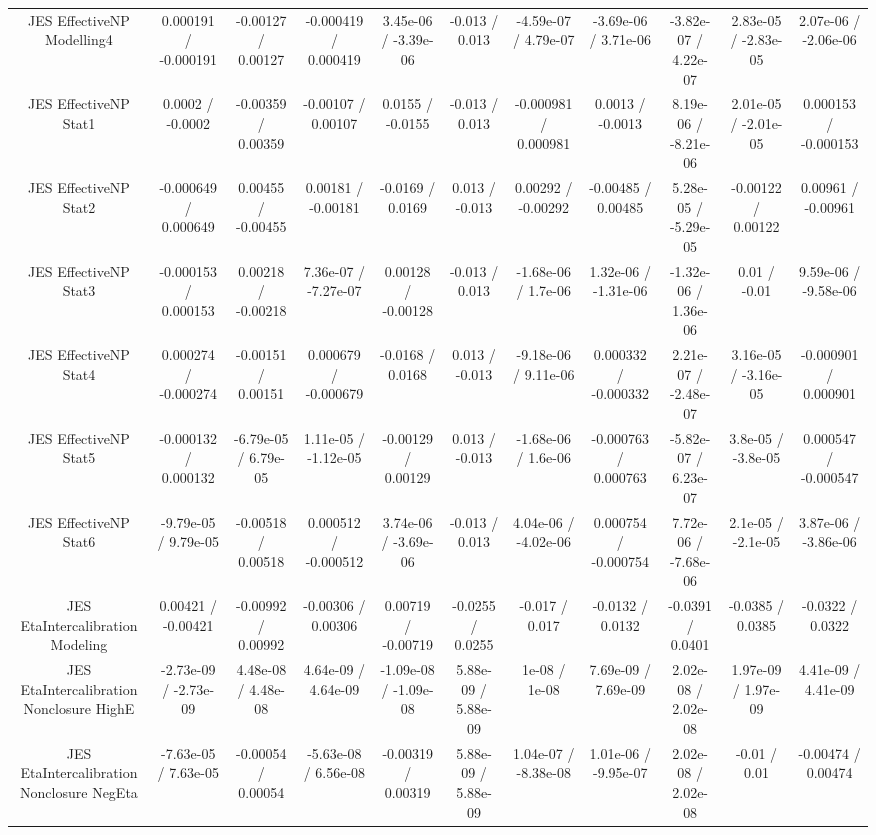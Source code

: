 \begin{table}[htbp]
\begin{center}
\begin{tabular}{|c|c|c|c|c|c|c|c|c|c|c|}
  JES EffectiveNP Modelling4 & 0.000191 / -0.000191 & -0.00127 / 0.00127 & -0.000419 / 0.000419 & 3.45e-06 / -3.39e-06 & -0.013 / 0.013 & -4.59e-07 / 4.79e-07 & -3.69e-06 / 3.71e-06 & -3.82e-07 / 4.22e-07 & 2.83e-05 / -2.83e-05 & 2.07e-06 / -2.06e-06 \\ 
  JES EffectiveNP Stat1 & 0.0002 / -0.0002 & -0.00359 / 0.00359 & -0.00107 / 0.00107 & 0.0155 / -0.0155 & -0.013 / 0.013 & -0.000981 / 0.000981 & 0.0013 / -0.0013 & 8.19e-06 / -8.21e-06 & 2.01e-05 / -2.01e-05 & 0.000153 / -0.000153 \\ 
  JES EffectiveNP Stat2 & -0.000649 / 0.000649 & 0.00455 / -0.00455 & 0.00181 / -0.00181 & -0.0169 / 0.0169 & 0.013 / -0.013 & 0.00292 / -0.00292 & -0.00485 / 0.00485 & 5.28e-05 / -5.29e-05 & -0.00122 / 0.00122 & 0.00961 / -0.00961 \\ 
  JES EffectiveNP Stat3 & -0.000153 / 0.000153 & 0.00218 / -0.00218 & 7.36e-07 / -7.27e-07 & 0.00128 / -0.00128 & -0.013 / 0.013 & -1.68e-06 / 1.7e-06 & 1.32e-06 / -1.31e-06 & -1.32e-06 / 1.36e-06 & 0.01 / -0.01 & 9.59e-06 / -9.58e-06 \\ 
  JES EffectiveNP Stat4 & 0.000274 / -0.000274 & -0.00151 / 0.00151 & 0.000679 / -0.000679 & -0.0168 / 0.0168 & 0.013 / -0.013 & -9.18e-06 / 9.11e-06 & 0.000332 / -0.000332 & 2.21e-07 / -2.48e-07 & 3.16e-05 / -3.16e-05 & -0.000901 / 0.000901 \\ 
  JES EffectiveNP Stat5 & -0.000132 / 0.000132 & -6.79e-05 / 6.79e-05 & 1.11e-05 / -1.12e-05 & -0.00129 / 0.00129 & 0.013 / -0.013 & -1.68e-06 / 1.6e-06 & -0.000763 / 0.000763 & -5.82e-07 / 6.23e-07 & 3.8e-05 / -3.8e-05 & 0.000547 / -0.000547 \\ 
  JES EffectiveNP Stat6 & -9.79e-05 / 9.79e-05 & -0.00518 / 0.00518 & 0.000512 / -0.000512 & 3.74e-06 / -3.69e-06 & -0.013 / 0.013 & 4.04e-06 / -4.02e-06 & 0.000754 / -0.000754 & 7.72e-06 / -7.68e-06 & 2.1e-05 / -2.1e-05 & 3.87e-06 / -3.86e-06 \\ 
  JES EtaIntercalibration Modeling & 0.00421 / -0.00421 & -0.00992 / 0.00992 & -0.00306 / 0.00306 & 0.00719 / -0.00719 & -0.0255 / 0.0255 & -0.017 / 0.017 & -0.0132 / 0.0132 & -0.0391 / 0.0401 & -0.0385 / 0.0385 & -0.0322 / 0.0322 \\ 
  JES EtaIntercalibration Nonclosure HighE & -2.73e-09 / -2.73e-09 & 4.48e-08 / 4.48e-08 & 4.64e-09 / 4.64e-09 & -1.09e-08 / -1.09e-08 & 5.88e-09 / 5.88e-09 & 1e-08 / 1e-08 & 7.69e-09 / 7.69e-09 & 2.02e-08 / 2.02e-08 & 1.97e-09 / 1.97e-09 & 4.41e-09 / 4.41e-09 \\ 
  JES EtaIntercalibration Nonclosure NegEta & -7.63e-05 / 7.63e-05 & -0.00054 / 0.00054 & -5.63e-08 / 6.56e-08 & -0.00319 / 0.00319 & 5.88e-09 / 5.88e-09 & 1.04e-07 / -8.38e-08 & 1.01e-06 / -9.95e-07 & 2.02e-08 / 2.02e-08 & -0.01 / 0.01 & -0.00474 / 0.00474 \\ 

\end{tabular}
\end{center}
\end{table}
